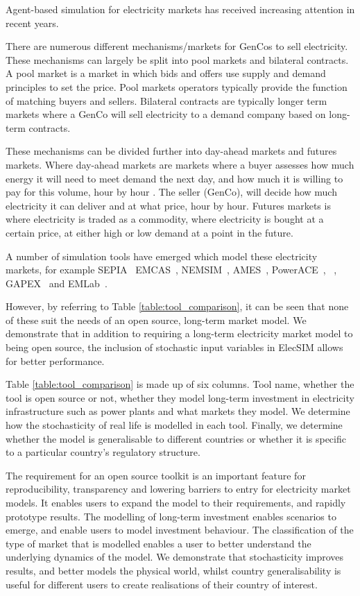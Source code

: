 Agent-based simulation for electricity markets has received increasing attention in recent years. 

There are numerous different mechanisms/markets for GenCos to sell electricity. These mechanisms can largely be split into pool markets and bilateral contracts. A pool market is a market in which bids and offers use supply and demand principles to set the price. Pool markets operators typically provide the function of matching buyers and sellers. Bilateral contracts are typically longer term markets where a GenCo will sell electricity to a demand company based on long-term contracts. 

These mechanisms can be divided further into day-ahead markets and futures markets. Where day-ahead markets are markets where a buyer assesses how much energy it will need to meet demand the next day, and how much it is willing to pay for this volume, hour by hour \cite{nordpool_20192}. The seller (GenCo), will decide how much electricity it can deliver and at what price, hour by hour. Futures markets is where electricity is traded as a commodity, where electricity is bought at a certain price, at either high or low demand at a point in the future.

A number of simulation tools have emerged which model these electricity markets, for example SEPIA~\cite{Harp2000} EMCAS~\cite{Conzelmann}, NEMSIM~\cite{Batten2006}, AMES~\cite{Sun2007}, PowerACE~\cite{Rothengatter2007}, ~\cite{Praca2003}, GAPEX~\cite{Cincotti2013} and  EMLab~\cite{Chappin2017}. 

However, by referring to Table \ref{table:tool_comparison}, it can be seen that none of these suit the needs of an open source, long-term market model. We demonstrate that in addition to requiring a long-term electricity market model to being open source, the inclusion of stochastic input variables in ElecSIM allows for better performance. 

Table \ref{table:tool_comparison} is made up of six columns. Tool name, whether the tool is open source or not, whether they model long-term investment in electricity infrastructure such as power plants and what markets they model. We determine how the stochasticity of real life is modelled in each tool. Finally, we determine whether the model is generalisable to different countries or whether it is specific to a particular country's regulatory structure. 

The requirement for an open source toolkit is an important feature for reproducibility, transparency and lowering barriers to entry for electricity market models. It enables users to expand the model to their requirements, and rapidly prototype results. The modelling of long-term investment enables scenarios to emerge, and enable users to model investment behaviour. The classification of the type of market that is modelled enables a user to better understand the underlying dynamics of the model. We demonstrate that stochasticity improves results, and better models the physical world, whilst country generalisability is useful for different users to create realisations of their country of interest.

